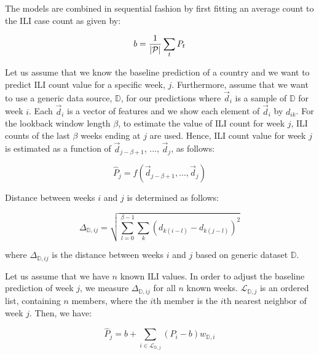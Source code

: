 The models are combined in sequential fashion by first fitting an average count to 
the ILI case count as given by:

\begin{equation*}
b = {1 \over {|\mathcal{P}|}} \sum_{t}P_{t}
\end{equation*}

Let us assume that we know the baseline prediction of a country and we want to
predict ILI count value for a specific week, $j$. Furthermore, assume that we
want to use a generic data source, $\mathbb{D}$, for our predictions where
$\vec{d}_i$ is a sample of $\mathbb{D}$ for week $i$. Each $\vec{d}_i$ is a
vector of features and we show each element of $\vec{d}_i$ by $d_{ik}$. For the
lookback window length $\beta$, to estimate the value of ILI count for week
$j$, ILI counts of the last $\beta$ weeks ending at $j$ are used. Hence, ILI
count value for week $j$ is estimated as a function of $\vec{d}_{j-\beta+1}$,
..., $\vec{d}_{j}$, as follows:

\begin{equation}
\hat{P}_{j} = \mathit{f}(\vec{d}_{j-\beta+1},...,\vec{d}_{j})
\end{equation}

Distance between weeks $i$ and $j$ is determined as follows:

\begin{equation}
\Delta_{\mathbb{D},ij} = \sqrt{\sum_{l=0}^{\beta-1} \sum_{k} (d_{k(i-l)}-d_{k(j-l)})^2}
\end{equation}

where $\Delta_{\mathbb{D},ij}$ is the distance between weeks $i$ and $j$ based on generic dataset $\mathbb{D}$.

Let us assume that we have $n$ known ILI values. In order to adjust the baseline prediction of week $j$, we measure $\Delta_{\mathbb{D},ij}$ for all $n$ known weeks. $\mathcal{L}_{\mathbb{D},j}$ is an ordered list, containing $n$ members, where the $i$th member is the $i$th nearest neighbor of week $j$. Then, we have:

\begin{equation}
\hat{P}_{j} = b + \sum_{i \in \mathcal{L}_{\mathbb{D},j}}{} (P_i - b)w_{\mathbb{D},i}
\label{eq:onesource}
\end{equation}

